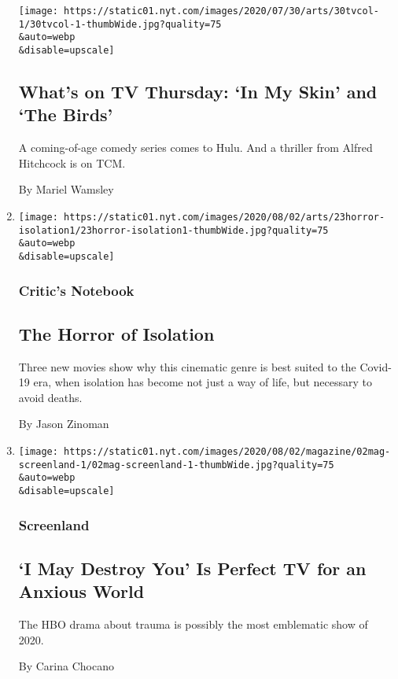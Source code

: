 \begin{enumerate}
  \texttt{[image: https://static01.nyt.com/images/2020/07/30/arts/30tvcol-1/30tvcol-1-thumbWide.jpg?quality=75\\\&auto=webp\\\&disable=upscale]}

  \hypertarget{whats-on-tv-thursday-in-my-skin-and-the-birds}{%
  \subsection{What's on TV Thursday: `In My Skin' and `The
  Birds'}\label{whats-on-tv-thursday-in-my-skin-and-the-birds}}

  A coming-of-age comedy series comes to Hulu. And a thriller from
  Alfred Hitchcock is on TCM.

  By Mariel Wamsley
\item
  \href{/2020/07/29/movies/horror-she-dies-tomorrow-relic-amulet.html}{}

  \texttt{[image: https://static01.nyt.com/images/2020/08/02/arts/23horror-isolation1/23horror-isolation1-thumbWide.jpg?quality=75\\\&auto=webp\\\&disable=upscale]}

  \hypertarget{critics-notebook-3}{%
  \subsubsection{Critic's Notebook}\label{critics-notebook-3}}

  \hypertarget{the-horror-of-isolation}{%
  \subsection{The Horror of Isolation}\label{the-horror-of-isolation}}

  Three new movies show why this cinematic genre is best suited to the
  Covid-19 era, when isolation has become not just a way of life, but
  necessary to avoid deaths.

  By Jason Zinoman
\item
  \href{/2020/07/29/magazine/i-may-destroy-you-hbo-michaela-coel.html}{}

  \texttt{[image: https://static01.nyt.com/images/2020/08/02/magazine/02mag-screenland-1/02mag-screenland-1-thumbWide.jpg?quality=75\\\&auto=webp\\\&disable=upscale]}

  \hypertarget{screenland}{%
  \subsubsection{Screenland}\label{screenland}}

  \hypertarget{i-may-destroy-you-is-perfect-tv-for-an-anxious-world}{%
  \subsection{`I May Destroy You' Is Perfect TV for an Anxious
  World}\label{i-may-destroy-you-is-perfect-tv-for-an-anxious-world}}

  The HBO drama about trauma is possibly the most emblematic show of
  2020.

  By Carina Chocano
\end{enumerate}

